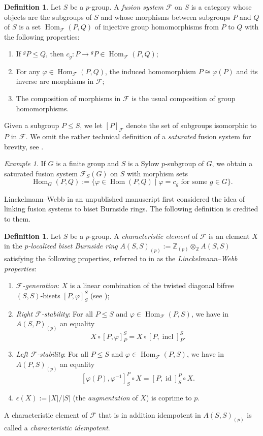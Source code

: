 \documentclass[]{amsart}
\newcommand{\Hom}{\operatorname{Hom}}
\newcommand{\inv}{^{-1}}
\newcommand{\id}{\operatorname{id}}
\newcommand{\on}[1]{\operatorname{#1}}
\newcommand{\calF}{\mathcal{F}}
\newcommand{\bbZ}{\mathbb{Z}}
\theoremstyle{remark}
\newtheorem{example}[theorem]{Example}
\theoremstyle{definition}
\newtheorem{definition}[theorem]{Definition}
\begin{document}
	\begin{definition}
		Let $S$ be a $p$-group. A \emph{fusion system} $\calF$ on $S$ is a category whose objects are the subgroups of $S$ and whose morphisms between subgroups $P$ and $Q$ of $S$ is a set $\Hom_\calF(P,Q)$ of injective group homomorphisms from $P$ to $Q$ with the following properties:
		\begin{enumerate}
			\item If ${}^gP \leq Q$, then $c_g\colon P \to {}^gP \in \Hom_\calF(P,Q)$;
			\item For any $\varphi\in \Hom_\calF(P,Q)$, the induced homomorphism $P \cong \varphi(P)$ and its inverse are morphisms in $\calF;$
			\item The composition of morphisms in $\calF$ is the usual composition of group homomorphisms.
		\end{enumerate}
		
		Given a subgroup $P \leq S$, we let $[P]_\calF$ denote the set of subgroups isomorphic to $P$ in $\calF$. We omit the rather technical definition of a \emph{saturated} fusion system for brevity, see \cite[Part I, Section 2]{AKO11}.
	\end{definition}
	
	\begin{example}
		If $G$ is a finite group and $S$ is a Sylow $p$-subgroup of $G$, we obtain a saturated fusion system $\calF_S(G)$ on $S$ with morphism sets \[\Hom_G(P,Q) := \{\varphi \in \Hom(P,Q)\mid \varphi = c_g \text{ for some } g \in G\}.\]
	\end{example}
	
	Linckelmann--Webb in an unpublished manuscript first considered the idea of linking fusion systems to biset Burnside rings. The following definition is credited to them. 
	
	\begin{definition}
		Let $S$ be a $p$-group. A \emph{characteristic element} of $\calF$ is an element $X$ in the \emph{$p$-localized biset Burnside ring} $A(S,S)_{(p)}:= \bbZ_{(p)}\otimes_\bbZ A(S,S)$ satisfying the following properties, referred to in \cite{RS13} as the \emph{Linckelmann--Webb properties}:
		\begin{enumerate}
			\item \emph{$\calF$-generation}: $X$ is a linear combination of the twisted diagonal bifree $(S,S)$-bisets $[P,\varphi]^S_S$ (see );
			\item \emph{Right $\calF$-stability}: For all $P \leq S$ and $\varphi \in \Hom_\calF(P,S)$, we have in $A(S,P)_{(p)}$ an equality \[X \circ [P,\varphi]^S_P = X \circ [P,\on{incl}]^S_P.\]
			\item \emph{Left $\calF$-stability}: For all $P\leq S$ and $\varphi \in \Hom_\calF(P,S)$, we have in $A(P,S)_{(p)}$ an equality \[[\varphi(P), \varphi\inv]^P_S \circ X = [P,\id]^P_S \circ X.\]
			\item $\epsilon(X) := |X|/|S|$ (the \emph{augmentation} of $X$) is coprime to $p$.
		\end{enumerate}
		A characteristic element of $\calF$ that is in addition idempotent in $A(S,S)_{(p)}$ is called a \emph{characteristic idempotent}.
	\end{definition}
	
\end{document}
